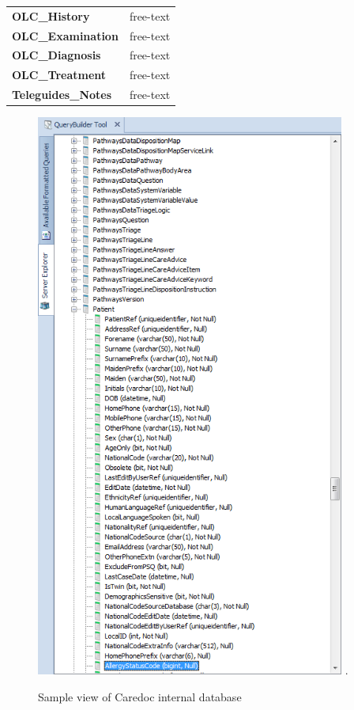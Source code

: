 \begin{table}[]
\begin{tabular}{lc}
\textbf{OLC\_History}      & free-text                                         \\
\textbf{OLC\_Examination}  & free-text                                         \\
\textbf{OLC\_Diagnosis}    & free-text                                         \\
\textbf{OLC\_Treatment}    & free-text                                         \\
\textbf{Teleguides\_Notes} & free-text                                        
\end{tabular}
\end{table}


\begin{figure}[!t]
\centering
\includegraphics[width=4.0in]{Figs/table-caredoc.png}
 \DeclareGraphicsExtensions.
\caption{Sample view of Caredoc internal database}
\label{fig:internal-caredoc}
\end{figure}